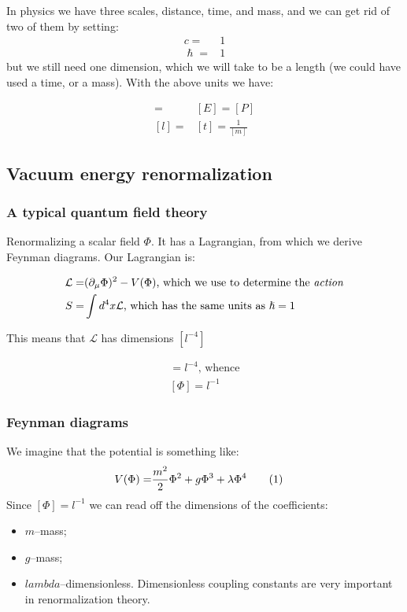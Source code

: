 \documentclass[]{article}
\newcommand\numberthis{\addtocounter{equation}{1}\tag{\theequation}}
\begin{document}
In physics we have three scales, distance, time, and mass, and we can get rid of two of them by setting:
\begin{align*}
	c=&1\\
	\hslash=& 1
\end{align*} 
but we still need one dimension, which we will take to be a length (we could have used a time, or a mass). With the above units we have: 

\begin{align*}
	[m] =& [E]	= [P]\\
	[l] =& [t]	= \frac{1}{[m]}
\end{align*}

\subsection{Vacuum energy renormalization}
\subsubsection{A typical quantum field theory}

Renormalizing a scalar field $\Phi$. It has a Lagrangian, from which we derive Feynman diagrams. Our Lagrangian is:

\begin{align*}
	\mathcal{L} =& (\partial_\mu \Phi)^2 - V(\Phi) \text{, which we use to determine the \emph{action}}\\
	S =& \int d^4 x \mathcal{L} \text{, which has the same units as $\hslash=1$}
\end{align*}

This means that $\mathcal{L}$ has dimensions $[l^{-4}]$

\begin{align*}
	[(\frac{\partial \Phi}{\partial x})^2]=l^{-4} \text{, whence}\\
	[\Phi] = l^{-1}
\end{align*}

\subsubsection{Feynman diagrams}

We imagine that the potential is something like:
\begin{align*}
	V(\Phi) =& \frac{m^2}{2} \Phi^2 + g \Phi^3 + \lambda \Phi^4 \numberthis \label{eq:potential}
\end{align*}
Since $[\Phi] = l^{-1}$ we can read off the dimensions of the coefficients:
\begin{itemize}
	\item $m$--mass;
	\item $g$--mass;
	\item $lambda$--dimensionless. Dimensionless coupling constants are very important in renormalization theory.
\end{itemize}
\end{document}
